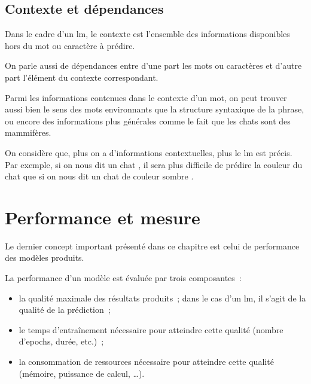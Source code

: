 \subsection{Contexte et dépendances}
Dans le cadre d'un \gls{lm}, le contexte est l'ensemble des informations disponibles hors du mot ou caractère à prédire.

On parle aussi de dépendances entre d'une part les mots ou caractères et d'autre part l'élément du contexte correspondant.

Parmi les informations contenues dans le contexte d'un mot, on peut trouver aussi bien le sens des mots environnants que la structure syntaxique de la phrase, ou encore des informations plus générales comme le fait que les chats sont des mammifères.


On considère que, plus on a d'informations contextuelles, plus le \gls{lm} est précis. Par exemple, si on nous dit \og un chat \fg{}, il sera plus difficile de prédire la couleur du chat que si on nous dit \og un chat de couleur sombre \fg{}.

\section{Performance et mesure}
Le dernier concept important présenté dans ce chapitre est celui de performance des modèles produits.

La performance d'un modèle est évaluée par trois composantes~:
\begin{itemize}
	\item la qualité maximale des résultats produits~; dans le cas d'un \gls{lm}, il s'agit de la qualité de la prédiction~;
	\item le temps d'entraînement nécessaire pour atteindre cette qualité (nombre d'\glspl{epoch}, durée, etc.)~;
	\item la consommation de ressources nécessaire pour atteindre cette qualité (mémoire, puissance de calcul, \dots).
\end{itemize}
\vspace{1em}


